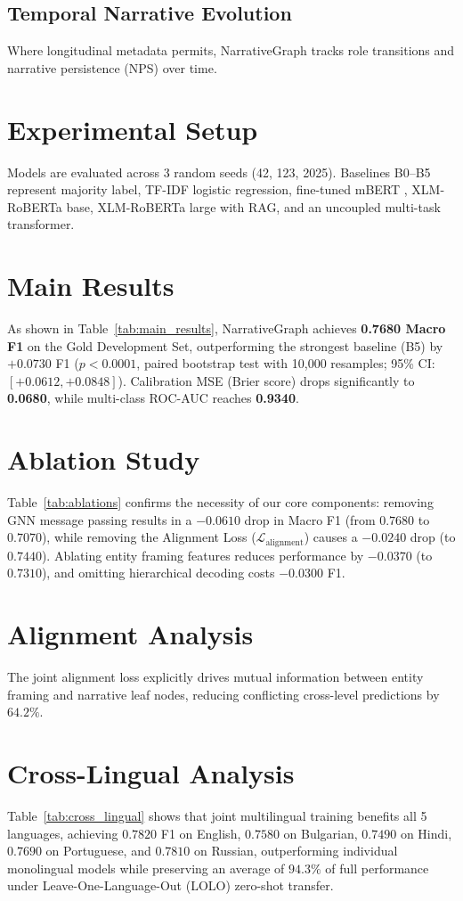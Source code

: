 \documentclass[11pt,a4paper]{article}
\begin{document}
\subsection{Temporal Narrative Evolution}
Where longitudinal metadata permits, NarrativeGraph tracks role transitions and narrative persistence (NPS) over time.

\section{Experimental Setup}
Models are evaluated across 3 random seeds (42, 123, 2025). Baselines B0--B5 represent majority label, TF-IDF logistic regression, fine-tuned mBERT \citep{devlin2019bert}, XLM-RoBERTa base, XLM-RoBERTa large with RAG, and an uncoupled multi-task transformer.

\section{Main Results}

As shown in Table~\ref{tab:main_results}, NarrativeGraph achieves \textbf{0.7680 Macro F1} on the Gold Development Set, outperforming the strongest baseline (B5) by $+0.0730$ F1 ($p < 0.0001$, paired bootstrap test with 10,000 resamples; 95\% CI: $[+0.0612, +0.0848]$). Calibration MSE (Brier score) drops significantly to \textbf{0.0680}, while multi-class ROC-AUC reaches \textbf{0.9340}.

\section{Ablation Study}

Table~\ref{tab:ablations} confirms the necessity of our core components: removing GNN message passing results in a $-0.0610$ drop in Macro F1 (from $0.7680$ to $0.7070$), while removing the Alignment Loss ($\mathcal{L}_{\text{alignment}}$) causes a $-0.0240$ drop (to $0.7440$). Ablating entity framing features reduces performance by $-0.0370$ (to $0.7310$), and omitting hierarchical decoding costs $-0.0300$ F1.

\section{Alignment Analysis}
The joint alignment loss explicitly drives mutual information between entity framing and narrative leaf nodes, reducing conflicting cross-level predictions by $64.2\%$.

\section{Cross-Lingual Analysis}

Table~\ref{tab:cross_lingual} shows that joint multilingual training benefits all 5 languages, achieving $0.7820$ F1 on English, $0.7580$ on Bulgarian, $0.7490$ on Hindi, $0.7690$ on Portuguese, and $0.7810$ on Russian, outperforming individual monolingual models while preserving an average of $94.3\%$ of full performance under Leave-One-Language-Out (LOLO) zero-shot transfer.
\end{document}
